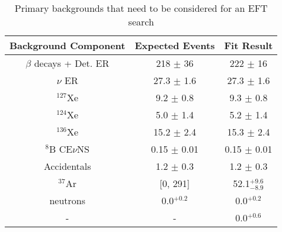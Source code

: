 


\begin{table}[]
    \centering
    \begin{tabular}{c|c|c}
        Background Component     & Expected Events    & Fit Result  \\ \hline
        $\beta$ decays + Det. ER & 218 $\pm$ 36       & 222 $\pm$ 16 \\
        $\nu$ ER                 & 27.3 $\pm$ 1.6     & 27.3 $\pm$ 1.6 \\
        ${}^{127}$Xe             & 9.2 $\pm$ 0.8      & 9.3 $\pm$ 0.8 \\
        ${}^{124}$Xe             & 5.0 $\pm$ 1.4      & 5.2 $\pm$ 1.4 \\
        ${}^{136}$Xe             & 15.2 $\pm$ 2.4     & 15.3 $\pm$ 2.4 \\
        ${}^{8}$B CE$\nu$NS      & 0.15 $\pm$ 0.01    & 0.15 $\pm$ 0.01 \\
        Accidentals              & 1.2 $\pm$ 0.3      & 1.2 $\pm$ 0.3 \\
        ${}^{37}$Ar              & [0, 291]           & 52.1${}^{+9.6}_{-8.9}$ \\
        neutrons                 & 0.0${}^{+0.2}$     & 0.0${}^{+0.2}$ \\
        -                        & -                  & 0.0${}^{+0.6}$ 
    \end{tabular}
    \caption{Primary backgrounds that need to be considered for an EFT search}
    \label{tab:sr1_ws_lz_backgrounds}
\end{table}
